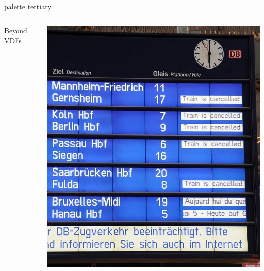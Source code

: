 \documentclass[aspectratio=169]{beamer}
\begin{document}

\begin{frame}[plain]
  \begin{beamercolorbox}[sep=0.1px,center,wd=\paperwidth,ht=\paperheight]{palette tertiary}
    \begin{columns}
      \begin{column}{0.55\textwidth}
        \Huge\centering\color{white} Beyond VDFs
      \end{column}
      \begin{column}{0.45\textwidth}
        \includegraphics[height=\paperheight]{db.jpg}
      \end{column}
    \end{columns}
  \end{beamercolorbox}
\end{frame}

\end{document}
